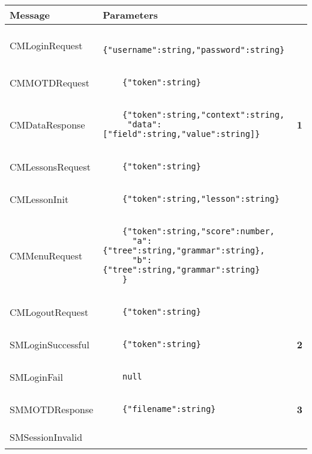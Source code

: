 \documentclass{scrartcl}
\begin{document}
\begin{tabular}{lll}
  Message & Parameters \\
  \hline
  CMLoginRequest &
  \begin{lstlisting}
    {"username":string,"password":string}
  \end{lstlisting} \\
  \hline
  CMMOTDRequest &
  \begin{lstlisting}
    {"token":string}
  \end{lstlisting} \\
  \hline
  CMDataResponse &
  \begin{lstlisting}
    {"token":string,"context":string,
     "data":["field":string,"value":string]}
  \end{lstlisting} & {\bfseries\footnotesize 1} \\
  \hline
  CMLessonsRequest &
  \begin{lstlisting}
    {"token":string}
  \end{lstlisting} \\
  \hline
  CMLessonInit &
  \begin{lstlisting}
    {"token":string,"lesson":string}
  \end{lstlisting} \\
  \hline
  CMMenuRequest &
  \begin{lstlisting}
    {"token":string,"score":number,
      "a":{"tree":string,"grammar":string},
      "b":{"tree":string,"grammar":string}
    }
  \end{lstlisting} \\
  \hline
  CMLogoutRequest &
  \begin{lstlisting}
    {"token":string}
  \end{lstlisting} \\
  \hline
  SMLoginSuccessful &
  \begin{lstlisting}
    {"token":string}
  \end{lstlisting} & {\bfseries\footnotesize 2} \\
  \hline
  SMLoginFail &
  \begin{lstlisting}
    null
  \end{lstlisting} \\
  \hline
  SMMOTDResponse &
  \begin{lstlisting}
    {"filename":string}
  \end{lstlisting} & {\bfseries\footnotesize 3} \\
  \hline
  SMSessionInvalid &
  \begin{lstlisting}

\end{lstlisting}
\end{tabular}
\end{document}
